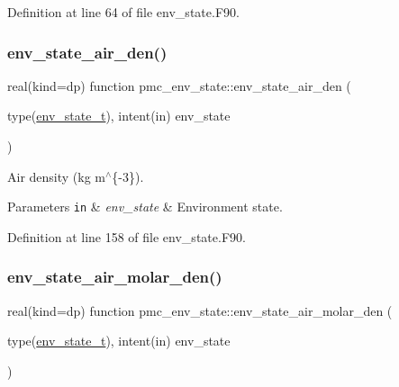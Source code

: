 Definition at line 64 of file env\+\_\+state.\+F90.

\mbox{\label{namespacepmc__env__state_a9ff224fb49c16b4bfe0ae896d9c278f2}} 
\subsubsection{\texorpdfstring{env\+\_\+state\+\_\+air\+\_\+den()}{env\_state\_air\_den()}}
{\footnotesize\ttfamily real(kind=dp) function pmc\+\_\+env\+\_\+state\+::env\+\_\+state\+\_\+air\+\_\+den (\begin{DoxyParamCaption}\item[{type(\mbox{\hyperlink{structpmc__env__state_1_1env__state__t}{env\+\_\+state\+\_\+t}}), intent(in)}]{env\+\_\+state }\end{DoxyParamCaption})}



Air density (kg m$^\wedge$\{-\/3\}). 


\begin{DoxyParams}[1]{Parameters}
\mbox{\tt in}  & {\em env\+\_\+state} & Environment state. \\
\hline
\end{DoxyParams}


Definition at line 158 of file env\+\_\+state.\+F90.

\mbox{\label{namespacepmc__env__state_a71d24aa32a9f0f3cbb919654fc588039}} 
\subsubsection{\texorpdfstring{env\+\_\+state\+\_\+air\+\_\+molar\+\_\+den()}{env\_state\_air\_molar\_den()}}
{\footnotesize\ttfamily real(kind=dp) function pmc\+\_\+env\+\_\+state\+::env\+\_\+state\+\_\+air\+\_\+molar\+\_\+den (\begin{DoxyParamCaption}\item[{type(\mbox{\hyperlink{structpmc__env__state_1_1env__state__t}{env\+\_\+state\+\_\+t}}), intent(in)}]{env\+\_\+state }\end{DoxyParamCaption})}



